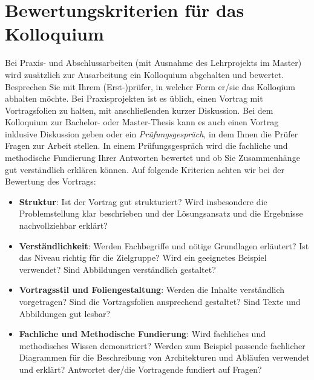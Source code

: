 \section{Bewertungskriterien für das Kolloquium}
\label{sec:bewertung-kolloquium}

Bei Praxis- und Abschlussarbeiten (mit Ausnahme des Lehrprojekts im Master) wird zusätzlich zur Ausarbeitung ein Kolloquium abgehalten und bewertet. Besprechen Sie mit Ihrem (Erst-)prüfer, in welcher Form er/sie das Kolloqium abhalten möchte. Bei Praxisprojekten ist es üblich, einen Vortrag mit Vortragsfolien zu halten, mit anschließenden kurzer Diskussion. Bei dem Kolloquium zur Bachelor- oder Master-Thesis kann es auch einen Vortrag inklusive Diskussion geben oder ein \textit{Prüfungsgespräch}, in dem Ihnen die Prüfer Fragen zur Arbeit stellen. In einem Prüfungsgespräch wird die fachliche und methodische Fundierung Ihrer Antworten bewertet und ob Sie Zusammenhänge gut verständlich erklären können.
Auf folgende Kriterien achten wir bei der Bewertung des Vortrags:

    \begin{itemize}

	    \item \textbf{Struktur}: Ist der Vortrag gut strukturiert? Wird insbesondere die Problemstellung klar beschrieben und der Lösungsansatz und die Ergebnisse nachvollziehbar erklärt?
	    
	    \item \textbf{Verständlichkeit}: Werden Fachbegriffe und nötige Grundlagen erläutert? Ist das Niveau richtig für die Zielgruppe? Wird ein geeignetes Beispiel verwendet? Sind Abbildungen verständlich gestaltet?
	    
    	\item \textbf{Vortragsstil und Foliengestaltung}: Werden die Inhalte verständlich vorgetragen? Sind die Vortragsfolien ansprechend gestaltet? Sind Texte und Abbildungen gut lesbar?
    	
    	\item \textbf{Fachliche und Methodische Fundierung}: Wird fachliches und methodisches Wissen demonstriert? Werden zum Beispiel  passende fachlicher Diagrammen für die Beschreibung von Architekturen und Abläufen verwendet und erklärt? Antwortet der/die Vortragende fundiert auf Fragen?
	
    \end{itemize}
    